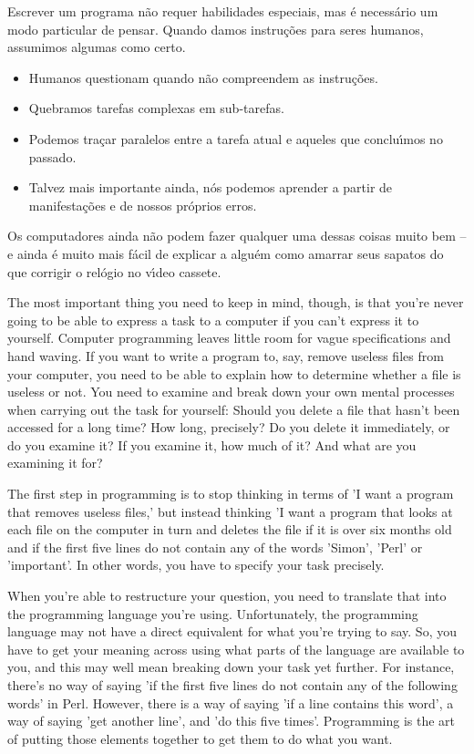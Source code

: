 \documentclass[a4paper,11pt]{book}
\begin{document}
\noindent Escrever um programa n\~ao requer habilidades especiais, mas \'e necess\'ario um modo particular de pensar. Quando damos instru\c{c}\~oes para seres humanos, assumimos algumas como certo.

\begin{itemize}

 \item Humanos questionam quando n\~ao compreendem as instru\c{c}\~oes.

 \item Quebramos tarefas complexas em sub-tarefas.

 \item Podemos tra\c{c}ar paralelos entre a tarefa atual e aqueles que conclu\'{\i}mos no passado.

 \item Talvez mais importante ainda, n\'os podemos aprender a partir de manifesta\c{c}\~oes e de nossos pr\'oprios erros.

\end{itemize} 

\noindent Os computadores ainda n\~ao podem fazer qualquer uma dessas coisas muito bem – e ainda \'e muito mais f\'acil de explicar a algu\'em como amarrar seus sapatos do que corrigir o rel\'ogio no v\'{\i}deo cassete.

\noindent The most important thing you need to keep in mind, though, is that you're never going to be able to express a task to a computer if you can't express it to yourself. Computer programming leaves little room for vague specifications and hand waving. If you want to write a program to, say, remove useless files from your computer, you need to be able to explain how to determine whether a file is useless or not. You need to examine and break down your own mental processes when carrying out the task for yourself: Should you delete a file that hasn't been accessed for a long time? How long, precisely? Do you delete it immediately, or do you examine it? If you examine it, how much of it? And what are you examining it for?

\noindent The first step in programming is to stop thinking in terms of 'I want a program that removes useless files,' but instead thinking 'I want a program that looks at each file on the computer in turn and deletes the file if it is over six months old and if the first five lines do not contain any of the words 'Simon', 'Perl' or 'important'. In other words, you have to specify your task precisely.

\noindent When you're able to restructure your question, you need to translate that into the programming language you're using. Unfortunately, the programming language may not have a direct equivalent for what you're trying to say. So, you have to get your meaning across using what parts of the language are available to you, and this may well mean breaking down your task yet further. For instance, there's no way of saying 'if the first five lines do not contain any of the following words' in Perl. However, there is a way of saying 'if a line contains this word', a way of saying 'get another line', and 'do this five times'. Programming is the art of putting those elements together to get them to do what you want.
\end{document}
